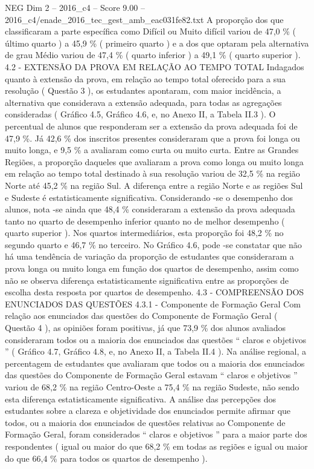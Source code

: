 \begin{textsample}{NEG Dim 2 – 2016\_c4 – Score 9.00 – 2016\_c4/enade\_2016\_tec\_gest\_amb\_eac031fe82.txt}
A proporção dos que classificaram a parte específica como Difícil ou Muito difícil variou de 47,0 \% ( último quarto ) a 45,9 \% ( primeiro quarto ) e a dos que optaram pela alternativa de grau Médio variou de 47,4 \% ( quarto inferior ) a 49,1 \% ( quarto superior ). 4.2 - EXTENSÃO DA PROVA EM RELAÇÃO AO TEMPO TOTAL Indagados quanto à extensão da prova, em relação ao tempo total oferecido para a sua resolução ( Questão 3 ), os estudantes apontaram, com maior incidência, a alternativa que considerava a extensão adequada, para todas as agregações consideradas ( Gráfico 4.5, Gráfico 4.6, e, no Anexo II, a Tabela II.3 ).
O percentual de alunos que responderam ser a extensão da prova adequada foi de 47,9 \%.
Já 42,6 \% dos inscritos presentes consideraram que a prova foi longa ou muito longa, e 9,5 \% a avaliaram como curta ou muito curta.
Entre as Grandes Regiões, a proporção daqueles que avaliaram a prova como longa ou muito longa em relação ao tempo total destinado à sua resolução variou de 32,5 \% na região Norte até 45,2 \% na região Sul.
A diferença entre a região Norte e as regiões Sul e Sudeste é estatisticamente significativa.
Considerando -se o desempenho dos alunos, nota -se ainda que 48,4 \% consideraram a extensão da prova adequada tanto no quarto de desempenho inferior quanto no de melhor desempenho ( quarto superior ).
Nos quartos intermediários, esta proporção foi 48,2 \% no segundo quarto e 46,7 \% no terceiro.
No Gráfico 4.6, pode -se constatar que não há uma tendência de variação da proporção de estudantes que consideraram a prova longa ou muito longa em função dos quartos de desempenho, assim como não se observa diferença estatisticamente significativa entre as proporções de escolha desta resposta por quartos de desempenho. 4.3 - COMPREENSÃO DOS ENUNCIADOS DAS QUESTÕES 4.3.1 - Componente de Formação Geral Com relação aos enunciados das questões do Componente de Formação Geral ( Questão 4 ), as opiniões foram positivas, já que 73,9 \% dos alunos avaliados consideraram todos ou a maioria dos enunciados das questões “ claros e objetivos ” ( Gráfico 4.7, Gráfico 4.8, e, no Anexo II, a Tabela II.4 ).
Na análise regional, a percentagem de estudantes que avaliaram que todos ou a maioria dos enunciados das questões do Componente de Formação Geral estavam “ claros e objetivos ” variou de 68,2 \% na região Centro-Oeste a 75,4 \% na região Sudeste, não sendo esta diferença estatisticamente significativa.
A análise das percepções dos estudantes sobre a clareza e objetividade dos enunciados permite afirmar que todos, ou a maioria dos enunciados de questões relativas ao Componente de Formação Geral, foram considerados “ claros e objetivos ” para a maior parte dos respondentes ( igual ou maior do que 68,2 \% em todas as regiões e igual ou maior do que 66,4 \% para todos os quartos de desempenho ).

\end{textsample}

